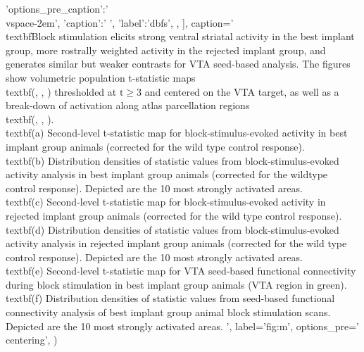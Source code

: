 \begin{sansmath}
{{                        'options_pre_caption':'\\vspace{-2em}',
                        'caption':'
                                ',
                        'label':'dbfs',
                        },
                ],
        caption='
                \\textbf{Block stimulation elicits strong ventral striatal activity in the best implant group, more rostrally weighted activity in the rejected implant group, and generates similar but weaker contrasts for VTA seed-based analysis.}
                The figures show volumetric population t-statistic maps \\textbf{(, , )} thresholded at $\mathrm{t \geq 3}$ and centered on the VTA target, as well as a break-down of activation along atlas parcellation regions \\textbf{(, , )}.
                \\textbf{(a)}
                        Second-level t-statistic map for block-stimulus-evoked activity in best implant group animals (corrected for the wild type control response).
                \\textbf{(b)}
                        Distribution densities of statistic values from block-stimulus-evoked activity analysis in best implant group animals (corrected for the wildtype control response). Depicted are the 10 most strongly activated areas.
                \\textbf{(c)}
                        Second-level t-statistic map for block-stimulus-evoked activity in rejected implant group animals (corrected for the wild type control response).
                \\textbf{(d)}
                        Distribution densities of statistic values from block-stimulus-evoked activity analysis in rejected implant group animals (corrected for the wild type control response). Depicted are the 10 most strongly activated areas.
                \\textbf{(e)}
                        Second-level t-statistic map for VTA seed-based functional connectivity during block stimulation in best implant group animals (VTA region in green).
                \\textbf{(f)}
                        Distribution densities of statistic values from seed-based functional connectivity analysis of best implant group animal block stimulation scans. Depicted are the 10 most strongly activated areas.
                ',
        label='fig:m',
        options_pre='\\centering',
        )}
\end{sansmath}


